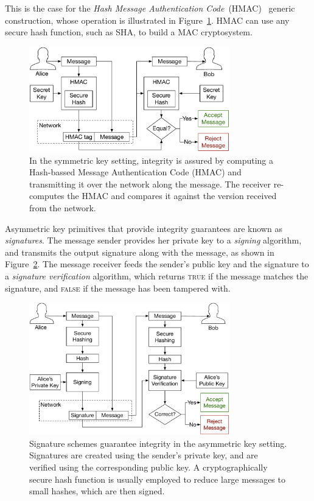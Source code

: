 This is the case for the
\textit{Hash Message Authentication Code}~(HMAC)~\cite{krawczyk1997hmac}
generic construction, whose operation is illustrated in
Figure~\ref{fig:symmetric_hmac}. HMAC can use any secure hash function, such as
SHA, to build a MAC cryptosystem.

\begin{figure}[hbt]
  \centering
  \includegraphics[width=87mm]{figures/symmetric_hmac.pdf}
  \caption{
    In the symmetric key setting, integrity is assured by computing a
    Hash-bassed Message Authentication Code (HMAC) and transmitting it over the
    network along the message. The receiver re-computes the HMAC and compares
    it against the version received from the network.
  }
  \label{fig:symmetric_hmac}
\end{figure}

Asymmetric key primitives that provide integrity guarantees are known as
\textit{signatures}. The message sender provides her private key to a
\textit{signing} algorithm, and transmits the output signature along with the
message, as shown in Figure~\ref{fig:asymmetric_signing}. The message receiver
feeds the sender's public key and the signature to a \textit{signature
verification} algorithm, which returns \textsc{true} if the message matches the
signature, and \textsc{false} if the message has been tampered with.

\begin{figure}[hbt]
  \centering
  \includegraphics[width=87mm]{figures/asymmetric_signing.pdf}
  \caption{
    Signature schemes guarantee integrity in the asymmetric key setting.
    Signatures are created using the sender's private key, and are verified
    using the corresponding public key. A cryptographically secure hash
    function is usually employed to reduce large messages to small hashes,
    which are then signed.
  }
  \label{fig:asymmetric_signing}
\end{figure}


